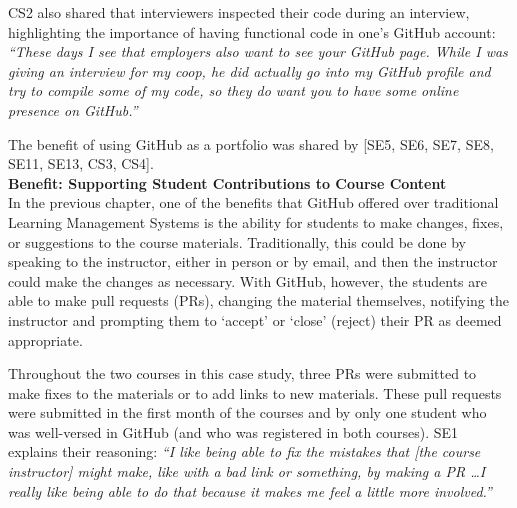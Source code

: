 CS2 also shared that interviewers inspected their code during an interview, highlighting the importance of having functional code in one's GitHub account: \textit{``These days I see that employers also want to see your GitHub page. While I was giving an interview for my coop, he did actually go into my GitHub profile and try to compile some of my code, so they do want you to have some online presence on GitHub.''}


The benefit of using GitHub as a portfolio was shared by [SE5, SE6, SE7, SE8, SE11, SE13, CS3, CS4]. \\


\textbf{Benefit: Supporting Student Contributions to Course Content} \\
In the previous chapter, one of the benefits that GitHub offered over traditional Learning Management Systems is the ability for students to make changes, fixes, or suggestions to the course materials. Traditionally, this could be done by speaking to the instructor, either in person or by email, and then the instructor could make the changes as necessary. With GitHub, however, the students are able to make pull requests (PRs), changing the material themselves, notifying the instructor and prompting them to `accept' or `close' (reject) their PR as deemed appropriate.

Throughout the two courses in this case study, three PRs were submitted to make fixes to the materials or to add links to new materials. These pull requests were submitted in the first month of the courses and by only one student who was well-versed in GitHub (and who was registered in both courses). SE1 explains their reasoning: \textit{``I like being able to fix the mistakes that [the course instructor] might make, like with a bad link or something, by making a PR \ldots I really like being able to do that because it makes me feel a little more involved.''}

